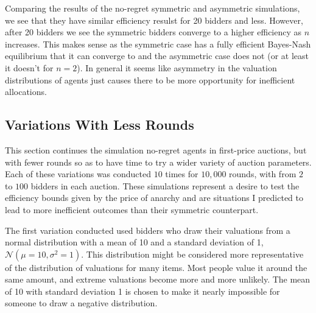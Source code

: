 \documentclass[12pt,twoside]{reedthesis}
\begin{document}
Comparing the results of the no-regret symmetric and asymmetric simulations, we see that they have similar efficiency resulst for 20 bidders and less. However, after 20 bidders we see the symmetric bidders converge to a higher efficiency as $n$ increases. This makes sense as the symmetric case has a fully efficient Bayes-Nash equilibrium that it can converge to and the asymmetric case does not (or at least it doesn't for $n=2$). In general it seems like asymmetry in the valuation distributions of agents just causes there to be more opportunity for inefficient allocations.

\label{section:BigSims}
\subsection{Variations With Less Rounds}
This section continues the simulation no-regret agents in first-price auctions, but with fewer rounds so as to have time to try a wider variety of auction parameters. Each of these variations was conducted $10$ times for $10,000$ rounds, with from $2$ to $100$ bidders in each auction. These simulations represent a desire to test the efficiency bounds given by the price of anarchy and are situations I predicted to lead to more inefficient outcomes than their symmetric counterpart.

The first variation conducted used bidders who draw their valuations from a normal distribution with a mean of 10 and a standard deviation of 1, $\mathcal{N}(\mu = 10, \sigma^2 =1)$. This distribution might be considered more representative of the distribution of valuations for many items. Most people value it around the same amount, and extreme valuations become more and more unlikely. The mean of 10 with standard deviation 1 is chosen to make it nearly impossible for someone to draw a negative distribution.
\end{document}
